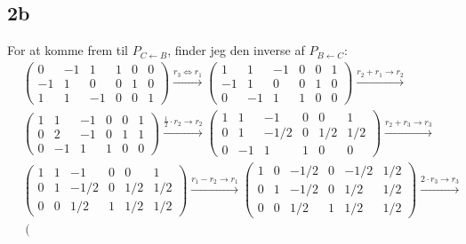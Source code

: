 \documentclass{article}
\begin{document}
\subsection*{2b}
For at komme frem til $P_{C \leftarrow B}$, finder jeg den inverse af $P_{B \leftarrow C}$:
$$
\begin{aligned}
& \left(\begin{array}{cccccc}
0 & -1 & 1 & 1 & 0 & 0 \\
-1 & 1 & 0 & 0 & 1 & 0 \\
1 & 1 & -1 & 0 & 0 & 1
\end{array}\right) \stackrel{r_3 \Leftrightarrow r_1}{\longrightarrow}\left(\begin{array}{ccc|ccc}
1 & 1 & -1 & 0 & 0 & 1 \\
-1 & 1 & 0 & 0 & 1 & 0 \\
0 & -1 & 1 & 1 & 0 & 0
\end{array}\right) \stackrel{r_2+r_1 \rightarrow r_2}{\longrightarrow} \\
& \left(\begin{array}{ccc|ccc}
1 & 1 & -1 & 0 & 0 & 1 \\
0 & 2 & -1 & 0 & 1 & 1 \\
0 & -1 & 1 & 1 & 0 & 0
\end{array}\right) \stackrel{\frac{1}{2} \cdot r_2 \rightarrow r_2}{\longrightarrow}\left(\begin{array}{ccccccc}
1 & 1 & -1 & 0 & 0 & 1 \\
0 & 1 & -1 / 2 & 0 & 1 / 2 & 1 / 2 \\
0 & -1 & 1 & 1 & 0 & 0
\end{array}\right) \stackrel{r_2+r_3 \rightarrow r_3}{\longrightarrow} \\
& \left(\begin{array}{ccc|ccc}
1 & 1 & -1 & 0 & 0 & 1 \\
0 & 1 & -1 / 2 & 0 & 1 / 2 & 1 / 2 \\
0 & 0 & 1 / 2 & 1 & 1 / 2 & 1 / 2
\end{array}\right) \stackrel{r_1-r_2 \rightarrow r_1}{\longrightarrow}\left(\begin{array}{ccc|ccc}
1 & 0 & -1 / 2 & 0 & -1 / 2 & 1 / 2 \\
0 & 1 & -1 / 2 & 0 & 1 / 2 & 1 / 2 \\
0 & 0 & 1 / 2 & 1 & 1 / 2 & 1 / 2
\end{array}\right) \stackrel{2 \cdot r_3 \rightarrow r_3}{\longrightarrow} \\
& \left(\begin{array}{ccc|ccc}

\end{array}
\end{aligned}$$
\end{document}
